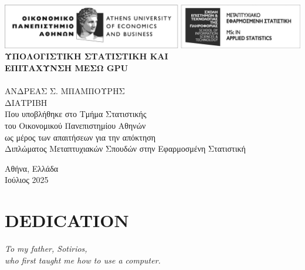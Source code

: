 \begin{titlepage}
    \centering

    \includegraphics[width=\textwidth]{img/aueb_applied_statistics.jpg} \\[3cm]
    {\fontsize{18}{22}\selectfont
    \bfseries
    ΥΠΟΛΟΓΙΣΤΙΚΗ ΣΤΑΤΙΣΤΙΚΗ ΚΑΙ\\[0.15cm]
    ΕΠΙΤΑΧΥΝΣΗ ΜΕΣΩ GPU} \\[2.5cm]

    \normalsize
    \ \\[0.5cm]
    {\fontsize{18}{22}\selectfont
    ΑΝΔΡΕΑΣ Σ. ΜΠΑΜΠΟΥΡΗΣ} \\[3cm]

    \normalsize
    ΔΙΑΤΡΙΒΗ \\[1cm]
    Που υποβλήθηκε στο Τμήμα Στατιστικής \\[0.25cm]
    του Οικονομικού Πανεπιστημίου Αθηνών \\[0.25cm]
    ως μέρος των απαιτήσεων για την απόκτηση \\[0.25cm]
    Διπλώματος Μεταπτυχιακών Σπουδών στην Εφαρμοσμένη Στατιστική

    \vfill

    Αθήνα, Ελλάδα \\
    Ιούλιος 2025
\end{titlepage}
\newpage

\frontmatter
\pagestyle{fancy}

\chapter*{DEDICATION}

\begin{flushright}
    \itshape
    To my father, Sotirios,\\
    who first taught me how to use a computer.
\end{flushright}

